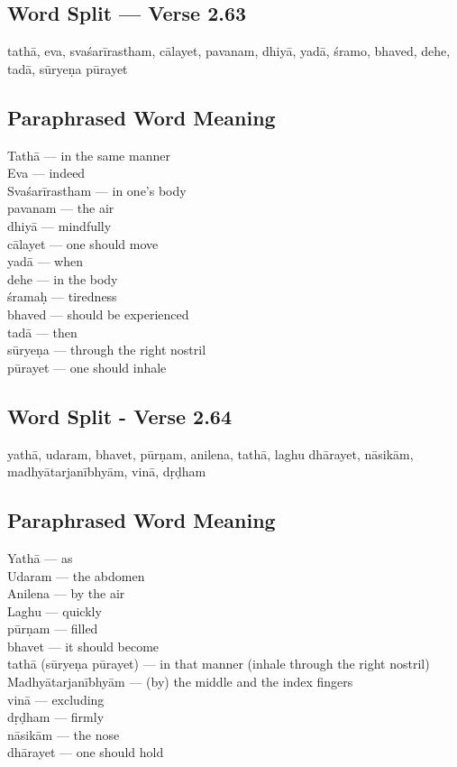 \subsection*{Word Split --- Verse 2.63}


tathā, eva, svaśarīrastham, cālayet, pavanam, dhiyā, yadā, śramo, bhaved, dehe, tadā, sūryeṇa pūrayet

\subsection*{Paraphrased Word Meaning}


\begin{multicols}{2}
Tathā --- in the same manner \\
Eva --- indeed \\
Svaśarīrastham --- in one’s body \\
pavanam  --- the air \\
dhiyā --- mindfully \\
cālayet --- one should move \\
yadā --- when \\
dehe --- in the body \\
śramaḥ --- tiredness \\
bhaved  --- should be experienced \\
tadā --- then\\
sūryeṇa --- through the right nostril \\
pūrayet --- one should inhale 
\end{multicols}

\subsection*{Word Split - Verse 2.64}

yathā, udaram, bhavet, pūrṇam, anilena, tathā, laghu dhārayet, nāsikām, madhyātarjanībhyām, vinā, dṛḍham
\newpage

\subsection*{Paraphrased Word Meaning}


\begin{multicols}{2}
Yathā --- as \\
Udaram --- the abdomen \\
Anilena --- by the air \\
Laghu --- quickly \\
pūrṇam --- filled \\
bhavet --- it should become \\
tathā (sūryeṇa pūrayet) --- in that manner (inhale through the right nostril)\\
Madhyātarjanībhyām --- (by) the middle and the index fingers \\
vinā  --- excluding\\
dṛḍham --- firmly\\
nāsikām --- the nose\\
dhārayet --- one should hold
\end{multicols}

